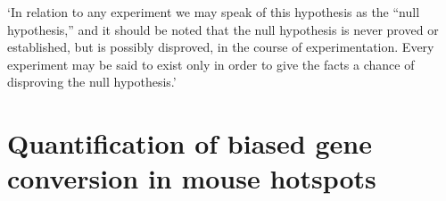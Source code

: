 \begin{savequote}[8cm]
	
	‘In relation to any experiment we may speak of this hypothesis as the “null hypothesis,” and it should be noted that the null hypothesis is never proved or established, but is possibly disproved, in the course of experimentation. Every experiment may be said to exist only in order to give the facts a chance of disproving the null hypothesis.’
	
	
\end{savequote}

\chapter{\label{ch:7-quantification-BGC}Quantification of biased gene conversion in mouse hotspots}


\minitoc{}

